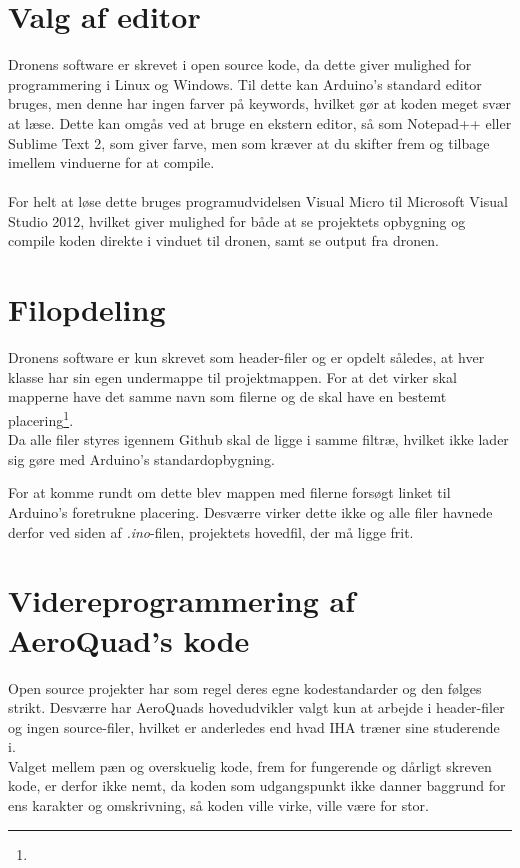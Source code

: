 \documentclass[Main]{subfiles}
\begin{document}
\section{Valg af editor}\label{sec:software}
Dronens software er skrevet i open source kode, da dette giver mulighed for programmering i Linux og Windows\cite{AQ-software}.
Til dette kan Arduino's standard editor bruges, men denne har ingen farver på keywords, hvilket gør at koden meget svær at læse.
Dette kan omgås ved at bruge en ekstern editor, så som Notepad++\cite{NotePadPP} eller Sublime Text 2\cite{Sublime2}, som giver farve, men som kræver at du skifter frem og tilbage imellem vinduerne for at compile.
\\
\\
For helt at løse dette bruges programudvidelsen Visual Micro\cite{VM} til Microsoft Visual Studio 2012, hvilket giver mulighed for både at se projektets opbygning og compile koden direkte i vinduet til dronen, samt se output fra dronen.



\section{Filopdeling}
Dronens software er kun skrevet som header-filer og er opdelt således, at hver klasse har sin egen undermappe til projektmappen.
For at det virker skal mapperne have det samme navn som filerne og de skal have en bestemt placering\footnote{}.
\\
Da alle filer styres igennem Github skal de ligge i samme filtræ, hvilket ikke lader sig gøre med Arduino's standardopbygning.


For at komme rundt om dette blev mappen med filerne forsøgt linket til Arduino's foretrukne  placering.
Desværre virker dette ikke og alle filer havnede derfor ved siden af \textit{.ino}-filen, projektets hovedfil, der må ligge frit.


\section{Videreprogrammering af AeroQuad's kode}
Open source projekter har som regel deres egne kodestandarder og den følges strikt.
Desværre har AeroQuads hovedudvikler valgt kun at arbejde i header-filer og ingen source-filer, hvilket er anderledes end hvad IHA træner sine studerende i.
\\
Valget mellem pæn og overskuelig kode, frem for fungerende og dårligt skreven kode, er derfor ikke nemt, da koden som udgangspunkt ikke danner baggrund for ens karakter og omskrivning, så koden ville virke, ville være for stor.
\end{document}
